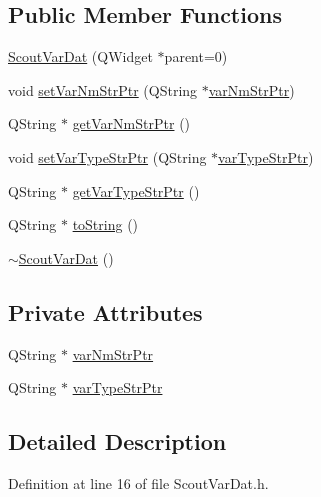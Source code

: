 \subsection*{Public Member Functions}
\begin{DoxyCompactItemize}
\item 
\hyperlink{class_scout_var_dat_a551a69d94bf98efbe6b68e4f727acb48}{Scout\-Var\-Dat} (Q\-Widget $\ast$parent=0)
\item 
void \hyperlink{class_scout_var_dat_af6bc836249bff77a6ac4ab034e30b106}{set\-Var\-Nm\-Str\-Ptr} (Q\-String $\ast$\hyperlink{class_scout_var_dat_a0ad65ef63afac8cdc452adf691cc1b23}{var\-Nm\-Str\-Ptr})
\item 
Q\-String $\ast$ \hyperlink{class_scout_var_dat_a94607c4ce421ec6ed5678d9112bf8fa5}{get\-Var\-Nm\-Str\-Ptr} ()
\item 
void \hyperlink{class_scout_var_dat_a8a822251e7063c3660858ab980427cb8}{set\-Var\-Type\-Str\-Ptr} (Q\-String $\ast$\hyperlink{class_scout_var_dat_a83360e9bfcdd440aecbd4c8e99c3ab08}{var\-Type\-Str\-Ptr})
\item 
Q\-String $\ast$ \hyperlink{class_scout_var_dat_ad5155bdf9dd8b10b98de74b5e803a07c}{get\-Var\-Type\-Str\-Ptr} ()
\item 
Q\-String $\ast$ \hyperlink{class_scout_var_dat_afbda8247aaa558f3a1e63a667dde8acc}{to\-String} ()
\item 
\hyperlink{class_scout_var_dat_a5f5b2433365246e471841c4a9ea20d6b}{$\sim$\-Scout\-Var\-Dat} ()
\end{DoxyCompactItemize}
\subsection*{Private Attributes}
\begin{DoxyCompactItemize}
\item 
Q\-String $\ast$ \hyperlink{class_scout_var_dat_a0ad65ef63afac8cdc452adf691cc1b23}{var\-Nm\-Str\-Ptr}
\item 
Q\-String $\ast$ \hyperlink{class_scout_var_dat_a83360e9bfcdd440aecbd4c8e99c3ab08}{var\-Type\-Str\-Ptr}
\end{DoxyCompactItemize}


\subsection{Detailed Description}


Definition at line 16 of file Scout\-Var\-Dat.\-h.



